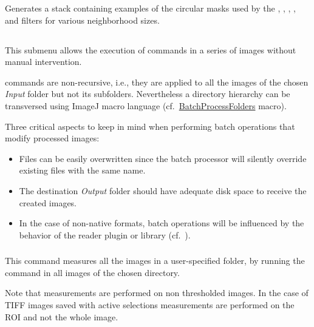 Generates a stack containing examples of the circular masks used by
the , ,
, ,
and  filters for various
neighborhood sizes.


\subsection{\protect{}\label{sub:Batch}}

This submenu allows the execution of commands in a series of images
without manual intervention. 

 commands are non-recursive, i.e.,
they are applied to all the images of the chosen \emph{Input} folder
but not its subfolders. Nevertheless a directory hierarchy can be
transversed using ImageJ macro language (cf.\ \href{http://imagej.nih.gov/ij/macros/BatchProcessFolders.txt}{BatchProcessFolders}
macro).

Three critical aspects to keep in mind when performing batch operations
that modify processed images: 
\begin{itemize}
\item Files can be easily overwritten since the batch processor will silently
override existing files with the same name.
\item The destination \emph{Output} folder should have adequate disk space
to receive the created images.
\item In the case of non-native formats, batch operations will be influenced
by the behavior of the reader plugin or library (cf.\ ).
\end{itemize}

\subsubsection{\protect{}\label{sub:Measure...}}

This command measures all the images in a user-specified
folder, by running the 
command in all images of the chosen directory.

Note that measurements are performed on non thresholded images. In
the case of TIFF images saved with active selections measurements
are performed on the ROI and not the whole image. 



